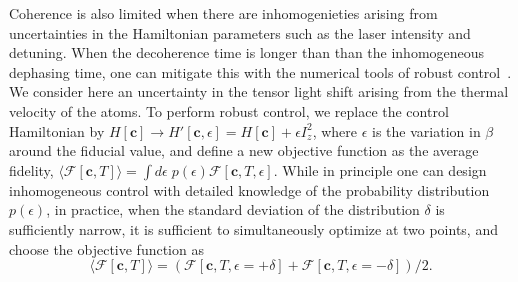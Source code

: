 \documentclass[aps,prl,twocolumn,reprint,superscriptaddress,footinbib]{revtex4-2}
\begin{document}
Coherence is also limited when there are inhomogenieties arising from uncertainties in the Hamiltonian parameters such as the laser intensity and detuning.  When the decoherence time is longer than than the inhomogeneous dephasing time, one can mitigate this with the numerical tools of robust control~\cite{PhysRevLett.82.2417, PhysRevA.58.2733, anderson2015accurate}.  We consider here an uncertainty in the tensor light shift arising from the thermal velocity of the atoms.  To perform robust control, we replace the control Hamiltonian by $H[\bm{c}] \rightarrow H'[\bm{c},\epsilon]=H[\bm{c}]+\epsilon I_z^2 $, where $\epsilon$ is the variation in $\beta$ around the fiducial value, and define a new objective function as the average fidelity, $\langle \mathcal{F}[\mathbf{c},T] \rangle =\int d\epsilon \; p(\epsilon)\mathcal{F}[\mathbf{c},T, \epsilon]$.  While in principle one can design inhomogeneous control with detailed knowledge of the probability distribution $p(\epsilon)$, in practice, when the standard deviation of the distribution $\delta$ is sufficiently narrow, it is sufficient to simultaneously optimize at two points\cite{anderson2015accurate},  and choose the objective function as 
\begin{equation}
\langle \mathcal{F}[\mathbf{c},T] \rangle = (\mathcal{F}[\mathbf{c},T, \epsilon=+\delta]+\mathcal{F}[\mathbf{c},T, \epsilon=-\delta])/2.
\end{equation}
\end{document}
